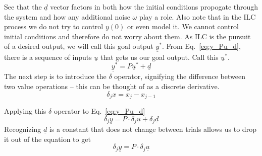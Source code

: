 See that the $\underline{d}$ vector factors in both how the initial conditions propogate through the system and how any additional noise $\omega$ play a role. Also note that in the ILC process we do not try to control $y\left(0\right)$ or even model it. We cannot control initial conditions and therefore do not worry about them.
As ILC is the pursuit of a desired output, we will call this goal output ${\underline{y}}^ \ast $. From Eq.~\ref{eq:y_Pu_d}, there is a sequence of inputs $\underline{u}$ that gets us our goal output. Call this ${\underline{u}}^ \ast $.
\begin{equation}
    {\underline{y}}^\ast=P{\underline{u}}^\ast+\underline{d}
    \label{eq:y*_Pu*_d}
\end{equation}
The next step is to introduce the $\delta$ operator, signifying the difference between two value operations -- this can be thought of as a discrete derivative.
\begin{equation}
    \delta_j x=x_j-x_{j-1}
    \label{eq:delta_operator}
\end{equation}

Applying this $\delta$ operator to Eq.~\ref{eq:y_Pu_d}
\begin{equation}
    \delta_j\underline{y}=P\cdot\delta_j\underline{u}+\delta_j\underline{d}
    \label{eq:del_P_with_d}
\end{equation}
Recognizing $\underline{d}$ is a constant that does not change between trials allows us to drop it out of the equation to get
\begin{equation}
    \delta_j\underline{y}=P\cdot\delta_j\underline{u}
    \label{eq:del_y_P_del_u}
\end{equation}

